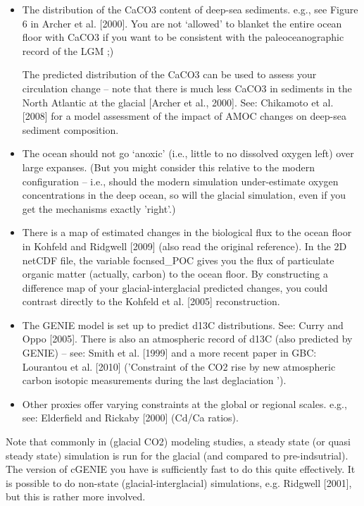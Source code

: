 \documentclass[11pt,fleqn]{book} %
\begin{document}
\begin{itemize}[noitemsep]

\item
The distribution of the CaCO3 content of deep-sea sediments. e.g., see Figure 6 in Archer
et al. [2000]. You are not ‘allowed’ to blanket the entire ocean floor with CaCO3 if you want
to be consistent with the paleoceanographic record of the LGM ;)

The predicted distribution of the CaCO3 can be used to assess your circulation change –
note that there is much less CaCO3 in sediments in the North Atlantic at the glacial [Archer
et al., 2000]. See: Chikamoto et al. [2008] for a model assessment of the impact of AMOC
changes on deep-sea sediment composition.

\item
The ocean should not go ‘anoxic’ (i.e., little to no dissolved oxygen left) over large
expanses. (But you might consider this relative to the modern configuration – i.e., should
the modern simulation under-estimate oxygen concentrations in the deep ocean, so will the
glacial simulation, even if you get the mechanisms exactly 'right'.)

\item
There is a map of estimated changes in the biological flux to the ocean floor in Kohfeld and
Ridgwell [2009] (also read the original reference). In the 2D netCDF file, the variable
focnsed\_POC gives you the flux of particulate organic matter (actually, carbon) to the ocean
floor. By constructing a difference map of your glacial-interglacial predicted changes, you
could contrast directly to the Kohfeld et al. [2005] reconstruction.

\item
The GENIE model is set up to predict d13C distributions. See: Curry and Oppo [2005].
There is also an atmospheric record of d13C (also predicted by GENIE) – see: Smith et al.
[1999] and a more recent paper in GBC: Lourantou et al. [2010] ('Constraint of the CO2 rise
by new atmospheric carbon isotopic measurements during the last deglaciation ').

\item Other proxies offer varying constraints at the global or regional scales. e.g., see: Elderfield
and Rickaby [2000] (Cd/Ca ratios).

\end{itemize}

Note that commonly in (glacial CO2) modeling studies, a steady state (or quasi steady state)
simulation is run for the glacial (and compared to pre-indsutrial). The version of cGENIE you have
is sufficiently fast to do this quite effectively. It is possible to do non-state (glacial-interglacial)
simulations, e.g. Ridgwell [2001], but this is rather more involved.
\end{document}
